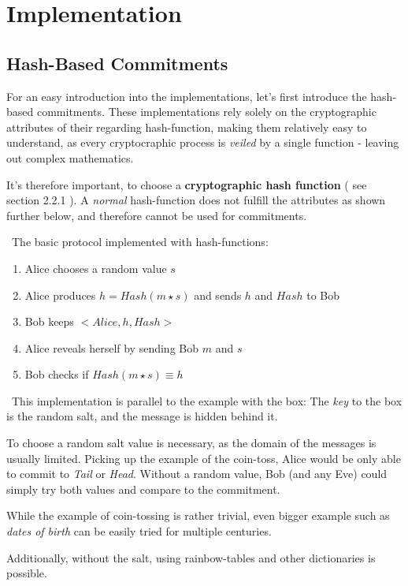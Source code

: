 
\section{Implementation}
\subsection{Hash-Based Commitments}
For an easy introduction into the implementations, let's first introduce the hash-based commitments. 
These implementations rely solely on the cryptographic attributes of their regarding hash-function, making them relatively easy to understand, as every cryptocraphic process is \textit{veiled} by a single function - leaving out complex mathematics.

It's therefore important, to choose a \textbf{cryptographic hash function} ( see \cite{DeHa15} section 2.2.1 ). A \textit{normal} hash-function does not fulfill the attributes as shown further below, and therefore cannot be used for commitments. 

~\newline The basic protocol implemented with hash-functions:
	\begin{enumerate}
		\item Alice chooses a random value $s$
		\item Alice produces $h = Hash(m \star s)$ and sends $h$ and $Hash$ to Bob
		\item Bob keeps $<Alice,h,Hash>$
		\item Alice reveals herself by sending Bob $m$ and $s$
		\item Bob checks if $Hash(m \star s) \equiv h$
	\end{enumerate}
~\newline This implementation is parallel to the example with the box: The \textit{key} to the box is the random salt, and the message is hidden behind it. 

To choose a random salt value is necessary, as the domain of the messages is usually limited. Picking up the example of the coin-toss, Alice would be only able to commit to \textit{Tail} or \textit{Head}. Without a random value, Bob (and any Eve) could simply try both values and compare to the commitment. 

While the example of coin-tossing is rather trivial, even bigger example such as \textit{dates of birth} can be easily tried for multiple centuries. 

Additionally, without the salt, using rainbow-tables and other dictionaries is possible. 

